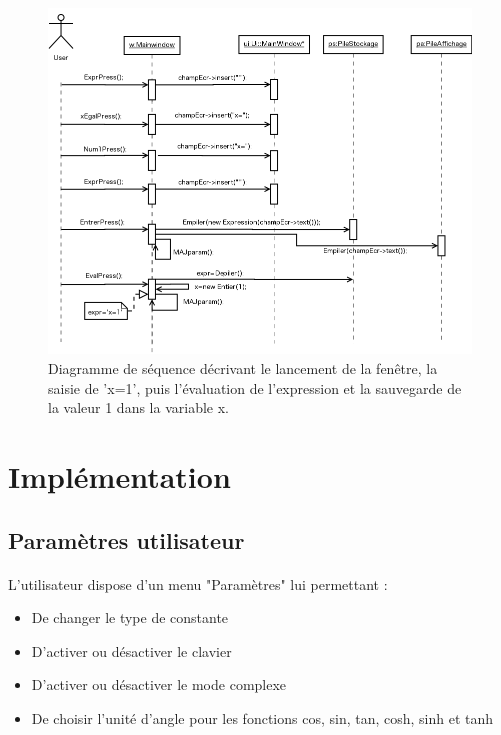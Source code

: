 \documentclass[a4paper,12pt]{article}
\begin{document}
		\begin{figure}[H]
			\center
			\includegraphics[width=16cm]{diag_seq_2.png}
			\caption{Diagramme de séquence décrivant le lancement de la fenêtre, la saisie de 'x=1', puis l'évaluation de l'expression et la sauvegarde de la valeur 1 dans la variable x.}
			\label{Diagramme sequence x}
		\end{figure}

\section{Implémentation}

	\subsection{Paramètres utilisateur}
		\paragraph{}L'utilisateur dispose d'un menu "Paramètres" lui permettant :
		\begin{itemize}
			\item{De changer le type de constante}
			\item{D'activer ou désactiver le clavier}
			\item{D'activer ou désactiver le mode complexe}
			\item{De choisir l'unité d'angle pour les fonctions cos, sin, tan, cosh, sinh et tanh}
		\end{itemize}
		
\end{document}
